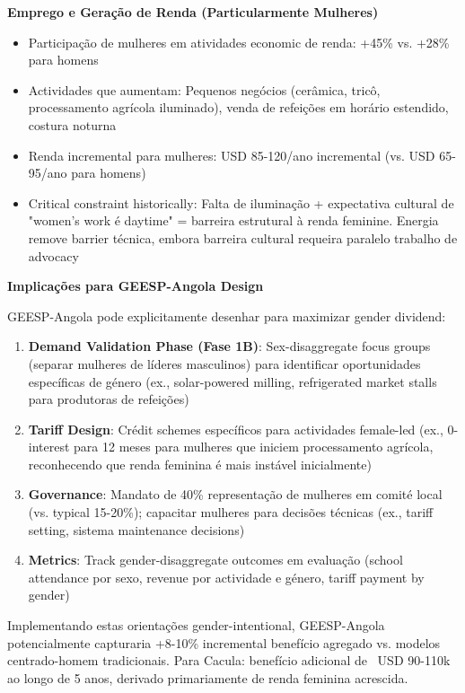 \documentclass[12pt, a4paper]{article}
\begin{document}
\textbf{Emprego e Geração de Renda (Particularmente Mulheres)}
\begin{itemize}
\item Participação de mulheres em atividades economic de renda: +45\% vs. +28\% para homens
\item Actividades que aumentam: Pequenos negócios (cerâmica, tricô, processamento agrícola iluminado), venda de refeições em horário estendido, costura noturna
\item Renda incremental para mulheres: USD 85-120/ano incremental (vs. USD 65-95/ano para homens)
\item Critical constraint historically: Falta de iluminação + expectativa cultural de "women's work é daytime" = barreira estrutural à renda feminine. Energia remove barrier técnica, embora barreira cultural requeira paralelo trabalho de advocacy
\end{itemize}

\textbf{Implicações para GEESP-Angola Design}

GEESP-Angola pode explicitamente desenhar para maximizar gender dividend:
\begin{enumerate}
\item \textbf{Demand Validation Phase (Fase 1B)}: Sex-disaggregate focus groups (separar mulheres de líderes masculinos) para identificar oportunidades específicas de género (ex., solar-powered milling, refrigerated market stalls para produtoras de refeições)
\item \textbf{Tariff Design}: Crédit schemes específicos para actividades female-led (ex., 0-interest para 12 meses para mulheres que iniciem processamento agrícola, reconhecendo que renda feminina é mais instável inicialmente)
\item \textbf{Governance}: Mandato de 40\% representação de mulheres em comité local (vs. typical 15-20\%); capacitar mulheres para decisões técnicas (ex., tariff setting, sistema maintenance decisions)
\item \textbf{Metrics}: Track gender-disaggregate outcomes em evaluação (school attendance por sexo, revenue por actividade e género, tariff payment by gender)
\end{enumerate}

Implementando estas orientações gender-intentional, GEESP-Angola potencialmente capturaria +8-10\% incremental benefício agregado vs. modelos centrado-homem tradicionais. Para Cacula: benefício adicional de ~USD 90-110k ao longo de 5 anos, derivado primariamente de renda feminina acrescida.
\end{document}
